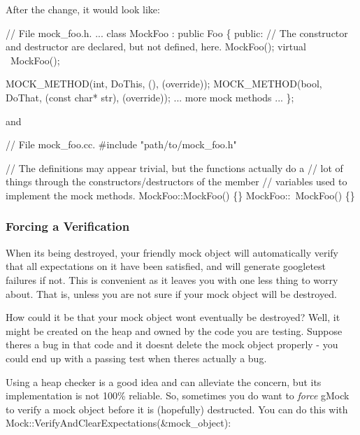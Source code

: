 After the change, it would look like\+:


\begin{DoxyCode}
\textcolor{comment}{// File mock\_foo.h.}
...
class MockFoo : \textcolor{keyword}{public} Foo \{
 \textcolor{keyword}{public}:
  \textcolor{comment}{// The constructor and destructor are declared, but not defined, here.}
  MockFoo();
  \textcolor{keyword}{virtual} ~MockFoo();

  MOCK\_METHOD(\textcolor{keywordtype}{int}, DoThis, (), (\textcolor{keyword}{override}));
  MOCK\_METHOD(\textcolor{keywordtype}{bool}, DoThat, (\textcolor{keyword}{const} \textcolor{keywordtype}{char}* str), (\textcolor{keyword}{override}));
  ... more mock methods ...
\};
\end{DoxyCode}


and


\begin{DoxyCode}
\textcolor{comment}{// File mock\_foo.cc.}
\textcolor{preprocessor}{#include "path/to/mock\_foo.h"}

\textcolor{comment}{// The definitions may appear trivial, but the functions actually do a}
\textcolor{comment}{// lot of things through the constructors/destructors of the member}
\textcolor{comment}{// variables used to implement the mock methods.}
MockFoo::MockFoo() \{\}
MockFoo::~MockFoo() \{\}
\end{DoxyCode}


\subsubsection*{Forcing a Verification}

When it\textquotesingle{}s being destroyed, your friendly mock object will automatically verify that all expectations on it have been satisfied, and will generate googletest failures if not. This is convenient as it leaves you with one less thing to worry about. That is, unless you are not sure if your mock object will be destroyed.

How could it be that your mock object won\textquotesingle{}t eventually be destroyed? Well, it might be created on the heap and owned by the code you are testing. Suppose there\textquotesingle{}s a bug in that code and it doesn\textquotesingle{}t delete the mock object properly -\/ you could end up with a passing test when there\textquotesingle{}s actually a bug.

Using a heap checker is a good idea and can alleviate the concern, but its implementation is not 100\% reliable. So, sometimes you do want to {\itshape force} g\+Mock to verify a mock object before it is (hopefully) destructed. You can do this with {\ttfamily Mock\+::\+Verify\+And\+Clear\+Expectations(\&mock\+\_\+object)}\+:


